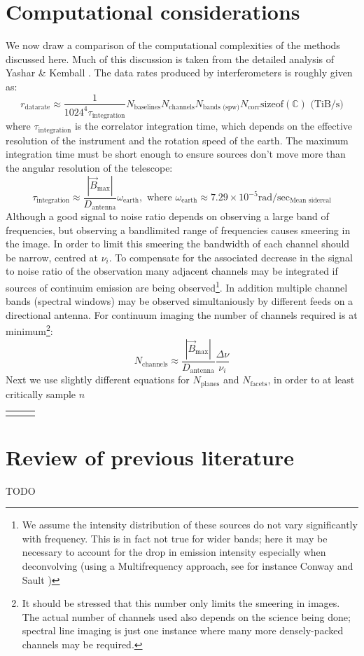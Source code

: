 \section{Computational considerations}
We now draw a comparison of the computational complexities of the methods discussed here. Much of this discussion is taken from the detailed analysis of 
Yashar \& Kemball \cite{yashar2009tdp}.
The data rates produced by interferometers is roughly given as:
\begin{equation}
 r_\text{datarate} \approx \frac{1}{1024^4\tau_{\text{integration}}}N_{\text{baselines}}N_{\text{channels}}N_{\text{bands (spw)}}N_{\text{corr}}\text{sizeof}(\mathbb{C})\text{ (TiB/s)}
\end{equation}
where $\tau_{\text{integration}}$ is the correlator integration time, which depends on the effective resolution of the instrument and the rotation speed of the earth.
The maximum integration time must be short enough to ensure sources don't move more than the angular resolution of the telescope:
\begin{equation}
 \tau_{\text{integration}} \approx \frac{|\vec{B}_{\text{max}}|}{D_{\text{antenna}}}\omega_\text{earth},\text{ where } \omega_\text{earth}\approx 7.29\times10^{-5}\text{rad}/\text{sec}_\text{Mean sidereal}
\end{equation}
Although a good signal to noise ratio depends on observing a large band of frequencies, but observing a bandlimited range of frequencies causes smeering in the image. In order to limit this smeering
the bandwidth of each channel should be narrow, centred at $\nu_i$. To compensate for the associated decrease in the signal to noise ratio of the observation many adjacent channels may be integrated if 
sources of continuim emission are being observed\footnote{We assume the intensity distribution of these sources do not vary significantly with frequency. This is in fact not true for wider bands; here 
it may be necessary to account for the drop in emission intensity especially when deconvolving (using a Multifrequency approach, see for instance Conway and Sault \cite[Lecture 21]{taylor1999synthesis})}. In addition 
multiple channel bands (spectral windows) may be observed simultaniously by different feeds on a directional antenna. For continuum imaging the number of channels required is at minimum\footnote{It should 
be stressed that this number only limits the smeering in images. The actual number of channels used also depends on the science being done; spectral line imaging is just one instance where many more 
densely-packed channels may be required.}:
\begin{equation}
 N_{\text{channels}} \approx \frac{|\vec{B}_{\text{max}}|}{D_{\text{antenna}}}\frac{\Delta{\nu}}{\nu_i}
\end{equation}
Next we use slightly different equations for $N_\text{planes}$ and $N_\text{facets}$, in order to at least critically sample $n$

\begin{tabular}[c]{|l|c|p{5cm}|}
 \hline
\caption[]{}
\label{tbl
\end{tabular}

\section{Review of previous literature}
TODO